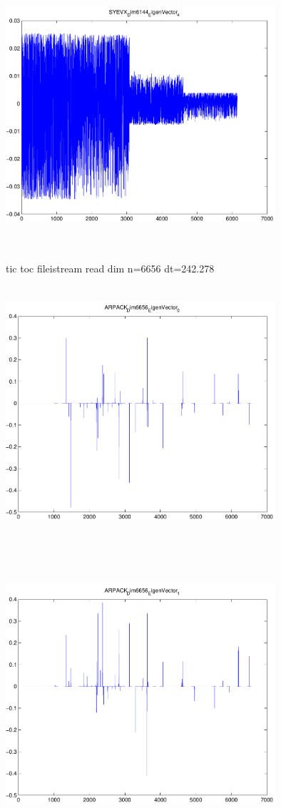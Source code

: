 \documentclass[9pt]{article}
\theoremstyle{plain}
\theoremstyle{definition}
\theoremstyle{remark}
\numberwithin{equation}{section}
\begin{document}
\includegraphics[width=10.0cm,height=10.0cm]{SYEVX_Dim6144_EigenVector_4.pdf}

tic toc fileistream read dim n=6656 dt=242.278
\includegraphics[width=10.0cm,height=10.0cm]{ARPACK_Dim6656_EigenVector_0.pdf}

\includegraphics[width=10.0cm,height=10.0cm]{ARPACK_Dim6656_EigenVector_1.pdf}
\end{document}
